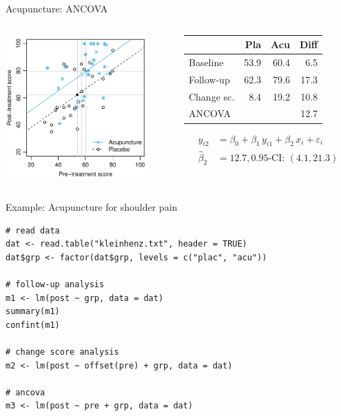 \documentclass[aspectratio=169]{beamer}
\begin{document}
\begin{frame}{Acupuncture: ANCOVA}
\begin{columns}[T]
\begin{column}{5.5cm}
  \includegraphics[width=5.5cm]{../figures/acu-anco}
\end{column}
%
\begin{column}{5.5cm}
  \vspace*{1em}\small
  \begin{tabular}{lrrr}
  \hline
             &  Pla &  Acu & Diff \\ \hline
  Baseline   & 53.9 & 60.4 &  6.5 \\
  Follow-up  & 62.3 & 79.6 & 17.3 \\
  Change sc. &  8.4 & 19.2 & 10.8 \\
  ANCOVA     &      &      & 12.7 \\ \hline
  \end{tabular}
\begin{align*}
         y_{i2} &= \beta_0 + \beta_1 \, y_{i1} + \beta_2 \, x_i +
                    \varepsilon_i \\
  \hat{\beta}_2 &= 12.7, 0.95\text{-CI: } (4.1, 21.3)
\end{align*}
\end{column}
\end{columns}
\end{frame}

\begin{frame}[fragile]{Example: Acupuncture for shoulder pain}
\begin{lstlisting}
# read data
dat <- read.table("kleinhenz.txt", header = TRUE)
dat$grp <- factor(dat$grp, levels = c("plac", "acu"))

# follow-up analysis
m1 <- lm(post ~ grp, data = dat)
summary(m1)
confint(m1)

# change score analysis
m2 <- lm(post ~ offset(pre) + grp, data = dat)

# ancova
m3 <- lm(post ~ pre + grp, data = dat)
\end{lstlisting}
\end{frame}
\end{document}
